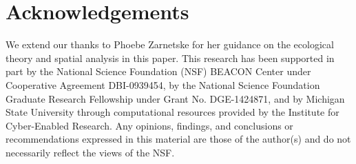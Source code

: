 \documentclass[letterpaper]{article}
\begin{document}
\section{Acknowledgements}

We extend our thanks to Phoebe Zarnetske for her guidance on the ecological theory and spatial analysis in this paper. This research has been supported in part by the National Science Foundation (NSF) BEACON Center under Cooperative Agreement DBI-0939454, by the National Science Foundation Graduate Research Fellowship under Grant No. DGE-1424871, and by Michigan State University through computational resources provided by the Institute for Cyber-Enabled Research. Any opinions, findings, and conclusions or recommendations expressed in this material are those of the author(s) and do not necessarily reflect the views of the NSF.




\end{document}
